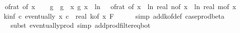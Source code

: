 \begin{isabellebody}
\ \ \ \ {\isacharparenleft}{\kern0pt}of{\isacharunderscore}{\kern0pt}rat\ {\isacharparenleft}{\kern0pt}{\isasymdelta}{\isacharunderscore}{\kern0pt}of\ x{\isacharparenright}{\kern0pt}{\isacharparenright}{\kern0pt}\isanewline
\isanewline
\ \ \isamarkupfalse%
\ g\ \ {\isachardoublequoteopen}g\ {\isacharequal}{\kern0pt}\ {\isacharparenleft}{\kern0pt}{\isasymlambda}x{\isachardot}{\kern0pt}\ g{}\ x\ {\isacharasterisk}{\kern0pt}\ {\isacharparenleft}{\kern0pt}ln\ {\isacharparenleft}{\kern0pt}{}\ {\isacharslash}{\kern0pt}\ of{\isacharunderscore}{\kern0pt}rat\ {\isacharparenleft}{\kern0pt}{\isasymepsilon}{\isacharunderscore}{\kern0pt}of\ x{\isacharparenright}{\kern0pt}{\isacharparenright}{\kern0pt}{\isacharparenright}{\kern0pt}\ {\isacharasterisk}{\kern0pt}\ {\isacharparenleft}{\kern0pt}ln\ {\isacharparenleft}{\kern0pt}real\ {\isacharparenleft}{\kern0pt}n{\isacharunderscore}{\kern0pt}of\ x{\isacharparenright}{\kern0pt}{\isacharparenright}{\kern0pt}\ {\isacharplus}{\kern0pt}\ ln\ {\isacharparenleft}{\kern0pt}real\ {\isacharparenleft}{\kern0pt}m{\isacharunderscore}{\kern0pt}of\ x{\isacharparenright}{\kern0pt}{\isacharparenright}{\kern0pt}{\isacharparenright}{\kern0pt}{\isacharparenright}{\kern0pt}{\isachardoublequoteclose}\isanewline
\isanewline
\ \ \isamarkupfalse%
\ k{\isacharunderscore}{\kern0pt}inf{\isacharcolon}{\kern0pt}\ {\isachardoublequoteopen}{\isasymAnd}c{\isachardot}{\kern0pt}\ eventually\ {\isacharparenleft}{\kern0pt}{\isasymlambda}x{\isachardot}{\kern0pt}\ c\ {\isasymle}\ {\isacharparenleft}{\kern0pt}real\ {\isacharparenleft}{\kern0pt}k{\isacharunderscore}{\kern0pt}of\ x{\isacharparenright}{\kern0pt}{\isacharparenright}{\kern0pt}{\isacharparenright}{\kern0pt}\ {\isacharquery}{\kern0pt}F{\isachardoublequoteclose}\isanewline
\ \ \ \ \isamarkupfalse%
\ {\isacharparenleft}{\kern0pt}simp\ add{\isacharcolon}{\kern0pt}k{\isacharunderscore}{\kern0pt}of{\isacharunderscore}{\kern0pt}def\ case{\isacharunderscore}{\kern0pt}prod{\isacharunderscore}{\kern0pt}beta{\isacharprime}{\kern0pt}{\isacharparenright}{\kern0pt}\isanewline
\ \ \ \ \isamarkupfalse%
\ {\isacharparenleft}{\kern0pt}subst\ eventually{\isacharunderscore}{\kern0pt}prod{}{\isacharprime}{\kern0pt}{\isacharcomma}{\kern0pt}\ simp\ add{\isacharcolon}{\kern0pt}prod{\isacharunderscore}{\kern0pt}filter{\isacharunderscore}{\kern0pt}eq{\isacharunderscore}{\kern0pt}bot{\isacharparenright}{\kern0pt}\isanewline

\end{isabellebody}
